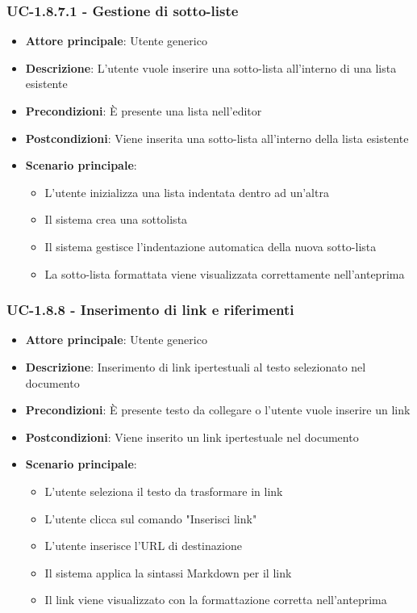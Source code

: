 \documentclass[11pt,a4paper]{article}
\begin{document}
\subsubsection{UC-1.8.7.1 - Gestione di sotto-liste}
\begin{itemize}
    \item \textbf{Attore principale}: Utente generico
    \item \textbf{Descrizione}: L'utente vuole inserire una sotto-lista all'interno di una lista esistente
    \item \textbf{Precondizioni}: È presente una lista nell'editor
    \item \textbf{Postcondizioni}: Viene inserita una sotto-lista all'interno della lista esistente
    \item \textbf{Scenario principale}:
        \begin{itemize}
            \item L'utente inizializza una lista indentata dentro ad un'altra
            \item Il sistema crea una sottolista
            \item Il sistema gestisce l'indentazione automatica della nuova sotto-lista
            \item La sotto-lista formattata viene visualizzata correttamente nell'anteprima
        \end{itemize}
\end{itemize}

\subsubsection{UC-1.8.8 - Inserimento di link e riferimenti}
\begin{itemize}
    \item \textbf{Attore principale}: Utente generico
    \item \textbf{Descrizione}: Inserimento di link ipertestuali al testo selezionato nel documento
    \item \textbf{Precondizioni}: È presente testo da collegare o l'utente vuole inserire un link
    \item \textbf{Postcondizioni}: Viene inserito un link ipertestuale nel documento
    \item \textbf{Scenario principale}:
        \begin{itemize}
            \item L'utente seleziona il testo da trasformare in link
            \item L'utente clicca sul comando "Inserisci link"
            \item L'utente inserisce l'URL di destinazione
            \item Il sistema applica la sintassi Markdown per il link
            \item Il link viene visualizzato con la formattazione corretta nell'anteprima
        \end{itemize}
\end{itemize}
\end{document}
